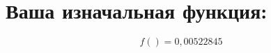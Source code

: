 \documentclass[12pt,a4paper]{scrartcl}
\begin{document}
\section{Ваша изначальная функция:} 
 \begin{equation} f() = {0,00522845}\end{equation}
\end{document}
